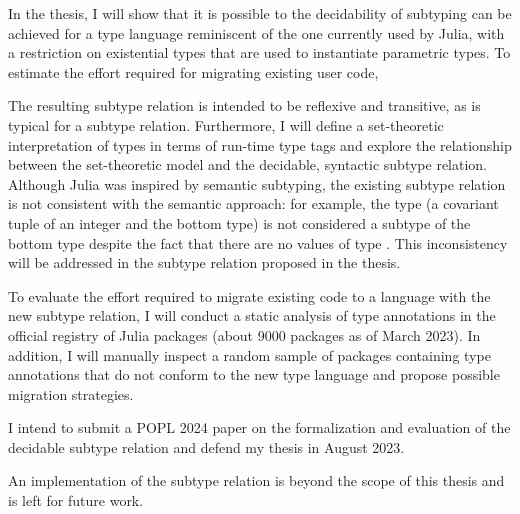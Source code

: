 In the thesis, I will show that it is possible to 
the decidability of subtyping can be achieved
for a type language reminiscent of the one currently used by Julia,
with a restriction on existential types that are used
to instantiate parametric types.
To estimate the effort required for migrating existing user code,

The resulting subtype relation is intended to be reflexive and transitive,
as is typical for a subtype relation. 
Furthermore, I will define a set-theoretic interpretation of types
in terms of run-time type tags and explore the relationship between
the set-theoretic model
and the decidable, syntactic subtype relation.
Although Julia was inspired by semantic subtyping, the existing subtype relation
is not consistent with the semantic approach: for example, the type 
 (a covariant tuple of an integer and the bottom type)
is not considered a subtype of the bottom type despite the fact that there are
no values of type .
This inconsistency will be addressed in the subtype relation proposed
in the thesis.

To evaluate the effort required to migrate existing code to a language
with the new subtype relation, I will conduct a static analysis of type
annotations in the official registry of Julia packages
(about 9000 packages as of March 2023).
In addition, I will manually inspect a random sample of packages containing
type annotations that do not conform to the new type language
and propose possible migration strategies.

I intend to submit a POPL 2024 paper on the formalization and evaluation of
the decidable subtype relation and defend my thesis in August 2023.

An implementation of the subtype relation is beyond the scope of this thesis and
is left for future work.


